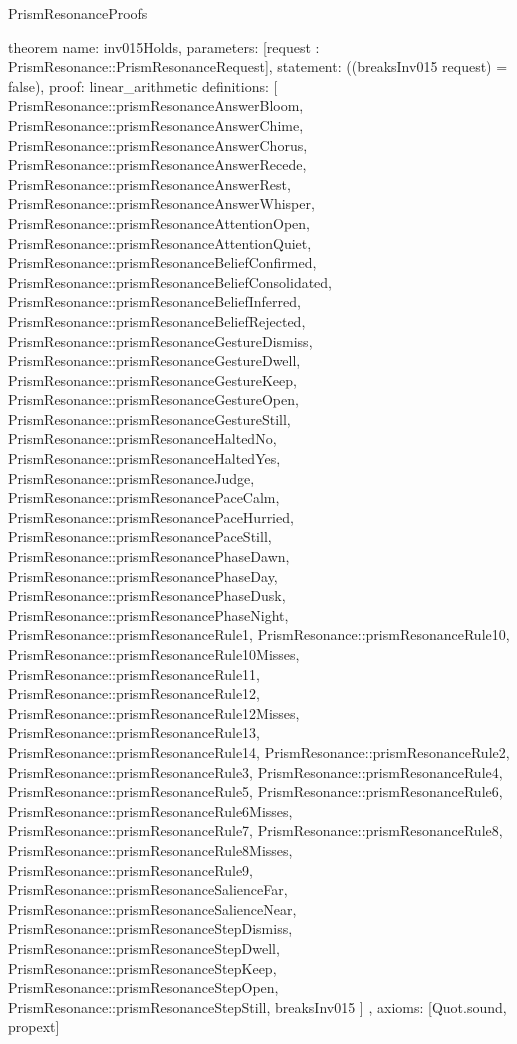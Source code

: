 \begin{lexlean}{PrismResonanceProofs}
\begin{semanticmodule}
theorem{
  name: inv015Holds,
  parameters: [request : PrismResonance::PrismResonanceRequest],
  statement: ((breaksInv015 request) = false),
  proof: linear_arithmetic{
    definitions: [
      PrismResonance::prismResonanceAnswerBloom,
      PrismResonance::prismResonanceAnswerChime,
      PrismResonance::prismResonanceAnswerChorus,
      PrismResonance::prismResonanceAnswerRecede,
      PrismResonance::prismResonanceAnswerRest,
      PrismResonance::prismResonanceAnswerWhisper,
      PrismResonance::prismResonanceAttentionOpen,
      PrismResonance::prismResonanceAttentionQuiet,
      PrismResonance::prismResonanceBeliefConfirmed,
      PrismResonance::prismResonanceBeliefConsolidated,
      PrismResonance::prismResonanceBeliefInferred,
      PrismResonance::prismResonanceBeliefRejected,
      PrismResonance::prismResonanceGestureDismiss,
      PrismResonance::prismResonanceGestureDwell,
      PrismResonance::prismResonanceGestureKeep,
      PrismResonance::prismResonanceGestureOpen,
      PrismResonance::prismResonanceGestureStill,
      PrismResonance::prismResonanceHaltedNo,
      PrismResonance::prismResonanceHaltedYes,
      PrismResonance::prismResonanceJudge,
      PrismResonance::prismResonancePaceCalm,
      PrismResonance::prismResonancePaceHurried,
      PrismResonance::prismResonancePaceStill,
      PrismResonance::prismResonancePhaseDawn,
      PrismResonance::prismResonancePhaseDay,
      PrismResonance::prismResonancePhaseDusk,
      PrismResonance::prismResonancePhaseNight,
      PrismResonance::prismResonanceRule1,
      PrismResonance::prismResonanceRule10,
      PrismResonance::prismResonanceRule10Misses,
      PrismResonance::prismResonanceRule11,
      PrismResonance::prismResonanceRule12,
      PrismResonance::prismResonanceRule12Misses,
      PrismResonance::prismResonanceRule13,
      PrismResonance::prismResonanceRule14,
      PrismResonance::prismResonanceRule2,
      PrismResonance::prismResonanceRule3,
      PrismResonance::prismResonanceRule4,
      PrismResonance::prismResonanceRule5,
      PrismResonance::prismResonanceRule6,
      PrismResonance::prismResonanceRule6Misses,
      PrismResonance::prismResonanceRule7,
      PrismResonance::prismResonanceRule8,
      PrismResonance::prismResonanceRule8Misses,
      PrismResonance::prismResonanceRule9,
      PrismResonance::prismResonanceSalienceFar,
      PrismResonance::prismResonanceSalienceNear,
      PrismResonance::prismResonanceStepDismiss,
      PrismResonance::prismResonanceStepDwell,
      PrismResonance::prismResonanceStepKeep,
      PrismResonance::prismResonanceStepOpen,
      PrismResonance::prismResonanceStepStill,
      breaksInv015
    ]
  },
  axioms: [Quot.sound, propext]
}


\end{semanticmodule}
\end{lexlean}
